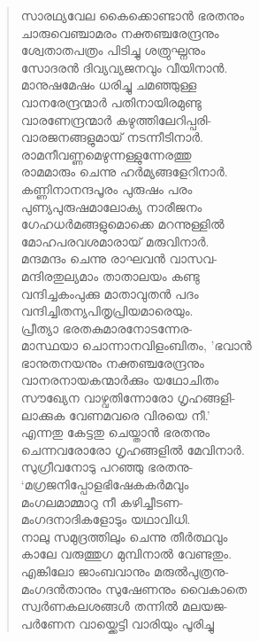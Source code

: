 \begin{verse}
സാരഥ്യവേല കൈക്കൊണ്ടാന്‍ ഭരതനും\\
ചാരുവെഞ്ചാമരം നക്തഞ്ചരേന്ദ്രനും\\
ശ്വേതാതപത്രം പിടിച്ചു ശത്രുഘ്നനും\\
സോദരന്‍ ദിവ്യവ്യജനവും വീയിനാന്‍.\\
മാനുഷമേഷം ധരിച്ചു ചമഞ്ഞുള്ള\\
വാനരേന്ദ്രന്മാര്‍ പതിനായിരമുണ്ടു\\
വാരണേന്ദ്രന്മാര്‍ കഴുത്തിലേറിപ്പരി-\\
വാരജനങ്ങളുമായ് നടന്നീടിനാര്‍.\\
രാമനീവണ്ണമെഴുന്നള്ളുന്നേരത്തു\\
രാമമാരും ചെന്നു ഹര്‍മ്യങ്ങളേറിനാര്‍.\\
കണ്ണിനാനന്ദപൂരം പുരുഷം പരം\\
പുണ്യപുരുഷമാലോക്യ നാരീജനം\\
ഗേഹധര്‍മങ്ങളുമൊക്കെ മറന്നുള്ളില്‍\\
മോഹപരവശമാരായ് മരുവിനാര്‍.\\
മന്ദമന്ദം ചെന്നു രാഘവന്‍ വാസവ-\\
മന്ദിരതുല്യമാം താതാലയം കണ്ടു\\
വന്ദിച്ചകംപുക്കു മാതാവുതന്‍ പദം\\
വന്ദിച്ചിതന്യപിതൃപ്രിയമാരെയും.\\
പ്രീത്യാ ഭരതകുമാരനോടന്നേര-\\
മാസ്ഥയാ ചൊന്നാനവിളംബിതം, ’ഭവാന്‍\\
ഭാനുതനയനും നക്തഞ്ചരേന്ദ്രനും\\
വാനരനായകന്മാര്‍ക്കും യഥോചിതം\\
സൗഖ്യേന വാഴ്വതിന്നോരോ ഗൃഹങ്ങളി-\\
ലാക്കുക വേണമവരെ വിരയെ നീ.’\\
എന്നതു കേട്ടതു ചെയ്താന്‍ ഭരതനും\\
ചെന്നവരോരോ ഗൃഹങ്ങളില്‍ മേവിനാര്‍.\\
സുഗ്രീവനോടു പറഞ്ഞു ഭരതനു-\\
‘മഗ്രജനിപ്പോളഭിഷേകകര്‍മവും\\
മംഗലമാമ്മാറു നീ കഴിച്ചീടണ-\\
മംഗദനാദികളോടും യഥാവിധി.\\
നാലു സമുദ്രത്തിലും ചെന്നു തീര്‍ത്ഥവും\\
കാലേ വരുത്തുഗ മുമ്പിനാല്‍ വേണ്ടതും.\\
എങ്കിലോ ജാംബവാനും മരുല്‍പുത്രനു-\\
മംഗദന്‍താനും സുഷേണനും വൈകാതെ\\
സ്വര്‍ണകലശങ്ങള്‍ തന്നില്‍ മലയജ-\\
പര്‍ണേന വായ്ക്കെട്ടി വാരിയും പൂരിച്ചു\\

\end{verse}
